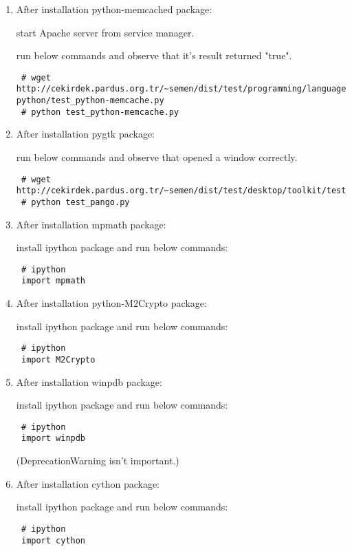 \documentclass[a4paper,10pt]{article}
\begin{document}
\begin{enumerate}
\begin{itemize}
\end{itemize}

\item After installation python-memcached package:

start Apache server from service manager.

run below commands and observe that it's result returned "true".
\begin{verbatim}
 # wget http://cekirdek.pardus.org.tr/~semen/dist/test/programming/language/
python/test_python-memcache.py
 # python test_python-memcache.py
\end{verbatim}

\item After installation pygtk package: 

run below commands and observe that opened a window correctly.

\begin{verbatim}
 # wget http://cekirdek.pardus.org.tr/~semen/dist/test/desktop/toolkit/test_pango.py
 # python test_pango.py
\end{verbatim}

\item After installation mpmath package:  

install ipython package and run below commands:
\begin{verbatim}
 # ipython
 import mpmath
\end{verbatim}

\item After installation python-M2Crypto package:

install ipython package and run below commands:
\begin{verbatim}
 # ipython
 import M2Crypto
\end{verbatim}

\item After installation winpdb package:

install ipython package and run below commands:
\begin{verbatim}
 # ipython
 import winpdb
\end{verbatim}
(DeprecationWarning isn't important.)

\item After installation cython package:

install ipython package and run below commands:
\begin{verbatim}
 # ipython
 import cython
\end{verbatim}


\end{enumerate}
\end{document}
